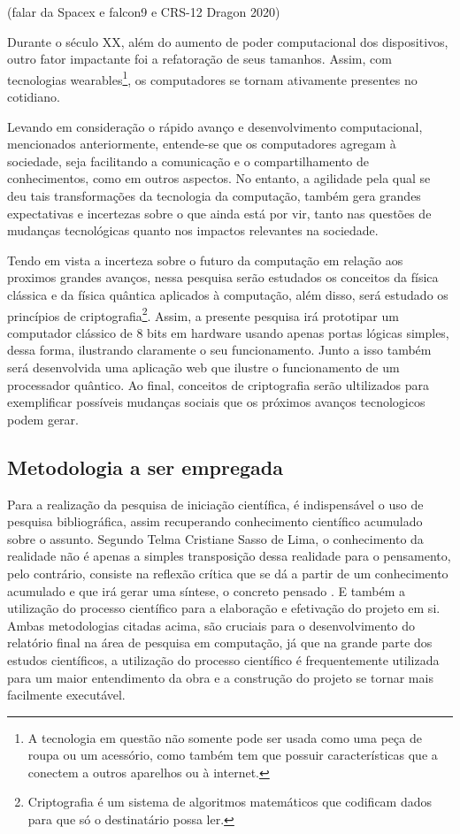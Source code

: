 (falar da Spacex e falcon9 e CRS-12 Dragon 2020)

Durante o século XX, além do aumento de poder computacional dos dispositivos, outro fator impactante foi a refatoração de seus tamanhos. Assim, com tecnologias wearables\footnote{A tecnologia em questão não somente pode ser usada como uma peça de roupa ou um acessório, como também tem que possuir características que a conectem a outros aparelhos ou à internet.}, os computadores se tornam ativamente presentes no cotidiano.

Levando em consideração o rápido avanço e desenvolvimento computacional, mencionados anteriormente, entende-se que os computadores agregam à sociedade, seja facilitando a comunicação e o compartilhamento de conhecimentos, como em outros aspectos. No entanto, a agilidade pela qual se deu tais transformações da tecnologia da computação, também gera grandes expectativas e incertezas sobre o que ainda está por vir, tanto nas questões de mudanças tecnológicas quanto nos impactos relevantes na sociedade.

Tendo em vista a incerteza sobre o futuro da computação em relação aos proximos grandes avanços, nessa pesquisa serão estudados os conceitos da física clássica e da física quântica aplicados à computação, além disso, será estudado os princípios de criptografia\footnote{Criptografia é um sistema de algoritmos matemáticos que codificam dados para que só o destinatário possa ler.}. Assim, a presente pesquisa irá prototipar um computador clássico de 8 bits em hardware usando apenas portas lógicas simples, dessa forma, ilustrando claramente o seu funcionamento. Junto a isso também será desenvolvida uma aplicação web que ilustre o funcionamento de um processador quântico. Ao final, conceitos de criptografia serão ultilizados para exemplificar possíveis mudanças sociais que os próximos avanços tecnologicos podem gerar.

\subsection{Metodologia a ser empregada}
Para a realização da pesquisa de iniciação científica, é indispensável o uso de pesquisa bibliográfica, assim recuperando conhecimento científico acumulado sobre o assunto. Segundo Telma Cristiane Sasso de Lima, o conhecimento da realidade não é apenas a simples transposição dessa realidade para o pensamento, pelo contrário, consiste na reflexão crítica que se dá a partir de um conhecimento acumulado e que irá gerar uma síntese, o concreto pensado \cite{1}. E também a utilização do processo científico para a elaboração e efetivação do projeto em si. Ambas metodologias citadas acima, são cruciais para o desenvolvimento do relatório final na área de pesquisa em computação, já que na grande parte dos estudos científicos, a utilização do processo científico é frequentemente utilizada para um maior entendimento da obra e a construção do projeto se tornar mais facilmente executável.


